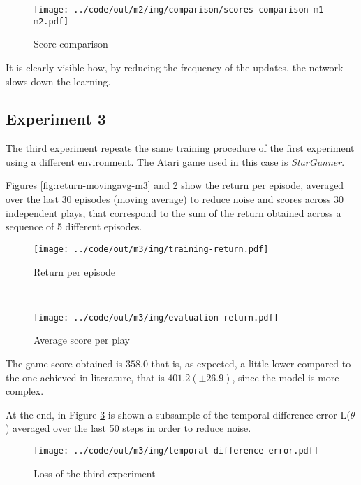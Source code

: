 \documentclass[a4paper,12pt]{article} %
\begin{document}
	\begin{figure}[htb]
		\centering
		\texttt{[image: ../code/out/m2/img/comparison/scores-comparison-m1-m2.pdf]}	
		\caption{Score comparison}
		\label{fig:score-m1-m2}
	\end{figure}
	It is clearly visible how, by reducing the frequency of the updates, the network slows down the learning.
	
	\subsection*{Experiment 3}
	The third experiment repeats the same training procedure of the first experiment using a different environment. The Atari game used in this case is \textit{StarGunner}.
	
	Figures \ref{fig:return-movingavg-m3} and \ref{fig:score-m3} show the return per episode, averaged over the last 30 episodes (moving average) to reduce noise and scores across 30 independent plays, that correspond to the sum of the return obtained across a sequence of 5 different episodes.
	
	\begin{figure}[htb]
		\begin{minipage}[b]{.49\textwidth}
			\centering
			\texttt{[image: ../code/out/m3/img/training-return.pdf]}	
			\caption{Return per episode}
			\label{fig:return-movingavg-m3}
		\end{minipage}
		~
		\begin{minipage}[b]{.49\textwidth}
			\centering
			\texttt{[image: ../code/out/m3/img/evaluation-return.pdf]}	
			\caption{Average score per play}
			\label{fig:score-m3}
		\end{minipage}
	\end{figure}
	
	The game score obtained is $358.0$ that is, as expected, a little lower compared to the one achieved in literature, that is $401.2 (\pm 26.9)$, since the model is more complex.
	
	\bigskip
	
	At the end, in Figure \ref{fig:loss-m3} is shown a subsample of the temporal-difference error L($\theta$) averaged over the last 50 steps in order to reduce noise.
	\begin{figure}[htb]
		\centering
		\texttt{[image: ../code/out/m3/img/temporal-difference-error.pdf]}	
		\caption{Loss of the third experiment}
		\label{fig:loss-m3}
	\end{figure} 
	
\end{document}
